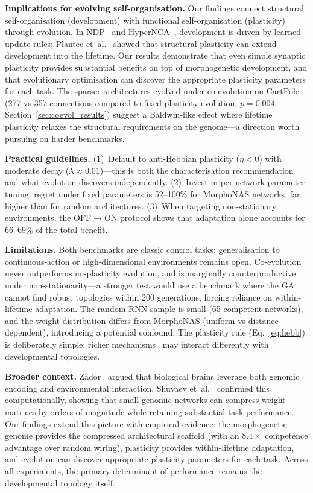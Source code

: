 \documentclass[sigconf,nonacm]{acmart}
\begin{document}
\textbf{Implications for evolving self-organisation.} Our findings connect structural self-organisation (development) with functional self-organisation (plasticity) through evolution. In NDP~\cite{najarro2023ndp} and HyperNCA~\cite{najarro2022hypernca}, development is driven by learned update rules; Plantec et~al.~\cite{plantec2024evolving} showed that structural plasticity can extend development into the lifetime. Our results demonstrate that even simple synaptic plasticity provides substantial benefits on top of morphogenetic development, and that evolutionary optimisation can discover the appropriate plasticity parameters for each task. The sparser architectures evolved under co-evolution on CartPole (277 vs 357 connections compared to fixed-plasticity evolution, $p = 0.004$; Section~\ref{sec:coevol_results}) suggest a Baldwin-like effect where lifetime plasticity relaxes the structural requirements on the genome---a direction worth pursuing on harder benchmarks.

\textbf{Practical guidelines.} (1)~Default to anti-Hebbian plasticity ($\eta < 0$) with moderate decay ($\lambda \approx 0.01$)---this is both the characterisation recommendation and what evolution discovers independently. (2)~Invest in per-network parameter tuning: regret under fixed parameters is 52--100\% for MorphoNAS networks, far higher than for random architectures. (3)~When targeting non-stationary environments, the OFF$\to$ON protocol shows that adaptation alone accounts for 66--69\% of the total benefit.

\textbf{Limitations.} Both benchmarks are classic control tasks; generalisation to continuous-action or high-dimensional environments remains open. Co-evolution never outperforms no-plasticity evolution, and is marginally counterproductive under non-stationarity---a stronger test would use a benchmark where the GA cannot find robust topologies within 200 generations, forcing reliance on within-lifetime adaptation. The random-RNN sample is small (65 competent networks), and the weight distribution differs from MorphoNAS (uniform vs distance-dependent), introducing a potential confound. The plasticity rule (Eq.~\ref{eq:hebb}) is deliberately simple; richer mechanisms~\cite{soltoggio2018born} may interact differently with developmental topologies.

\textbf{Broader context.} Zador~\cite{zador2019critique} argued that biological brains leverage both genomic encoding and environmental interaction. Shuvaev et~al.~\cite{shuvaev2024encoding} confirmed this computationally, showing that small genomic networks can compress weight matrices by orders of magnitude while retaining substantial task performance. Our findings extend this picture with empirical evidence: the morphogenetic genome provides the compressed architectural scaffold (with an $8.4\times$ competence advantage over random wiring), plasticity provides within-lifetime adaptation, and evolution can discover appropriate plasticity parameters for each task. Across all experiments, the primary determinant of performance remains the developmental topology itself.
\end{document}
